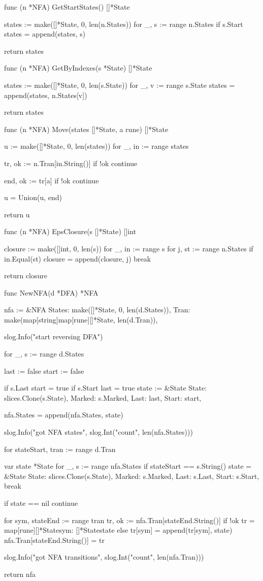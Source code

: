 func (n *NFA) GetStartStates() []*State {
	states := make([]*State, 0, len(n.States))
	for _, s := range n.States {
		if s.Start {
			states = append(states, s)
		}
	}

	return states
}

func (n *NFA) GetByIndexes(s *State) []*State {
	states := make([]*State, 0, len(s.State))
	for _, v := range s.State {
		states = append(states, n.States[v])
	}

	return states
}

func (n *NFA) Move(states []*State, a rune) []*State {
	u := make([]*State, 0, len(states))
	for _, in := range states {
		tr, ok := n.Tran[in.String()]
		if !ok {
			continue
		}

		end, ok := tr[a]
		if !ok {
			continue
		}

		u = Union(u, end)
	}

	return u
}

func (n *NFA) EpsClosure(s []*State) []int {
	closure := make([]int, 0, len(s))
	for _, in := range s {
		for j, st := range n.States {
			if in.Equal(st) {
				closure = append(closure, j)
				break
			}
		}
	}

	return closure
}

func NewNFA(d *DFA) *NFA {
	nfa := &NFA{
		States: make([]*State, 0, len(d.States)),
		Tran:   make(map[string]map[rune][]*State, len(d.Tran)),
	}

	slog.Info("start reversing DFA")

	for _, s := range d.States {
		last := false
		start := false

		if s.Last {
			start = true
		}
		if s.Start {
			last = true
		}
		state := &State{
			State:  slices.Clone(s.State),
			Marked: s.Marked,
			Last:   last,
			Start:  start,
		}

		nfa.States = append(nfa.States, state)
	}

	slog.Info("got NFA states", slog.Int("count", len(nfa.States)))

	for stateStart, tran := range d.Tran {
		var state *State
		for _, s := range nfa.States {
			if stateStart == s.String() {
				state = &State{
					State:  slices.Clone(s.State),
					Marked: s.Marked,
					Last:   s.Last,
					Start:  s.Start,
				}
				break
			}
		}

		if state == nil {
			continue
		}

		for sym, stateEnd := range tran {
			tr, ok := nfa.Tran[stateEnd.String()]
			if !ok {
				tr = map[rune][]*State{sym: []*State{state}}
			} else {
				tr[sym] = append(tr[sym], state)
			}
			nfa.Tran[stateEnd.String()] = tr
		}
	}

	slog.Info("got NFA transitions", slog.Int("count", len(nfa.Tran)))

	return nfa
}


